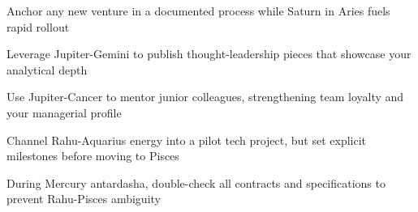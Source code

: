 \begin{diamondlist}
  \item {\fontsize{8.5}{12}\selectfont Anchor any new venture in a documented process while Saturn in Aries fuels rapid rollout}
  \item {\fontsize{8.5}{12}\selectfont Leverage Jupiter-Gemini to publish thought-leadership pieces that showcase your analytical depth}
  \item {\fontsize{8.5}{12}\selectfont Use Jupiter-Cancer to mentor junior colleagues, strengthening team loyalty and your managerial profile}
  \item {\fontsize{8.5}{12}\selectfont Channel Rahu-Aquarius energy into a pilot tech project, but set explicit milestones before moving to Pisces}
  \item {\fontsize{8.5}{12}\selectfont During Mercury antardasha, double-check all contracts and specifications to prevent Rahu-Pisces ambiguity}
\end{diamondlist}


